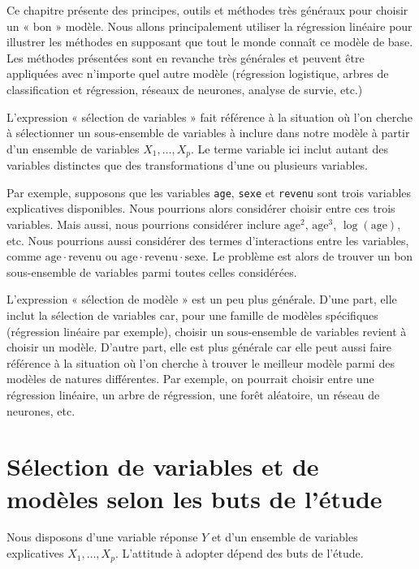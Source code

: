 \documentclass[
  11pt,
  letterpaper,
]{book}
\theoremstyle{definition}
\theoremstyle{definition}
\theoremstyle{definition}
\theoremstyle{definition}
\theoremstyle{remark}
\begin{document}
Ce chapitre présente des principes, outils et méthodes très généraux pour choisir un « bon » modèle. Nous allons principalement utiliser la régression linéaire pour illustrer les méthodes en supposant que tout le monde connaît ce modèle de base. Les méthodes présentées sont en revanche très générales et peuvent être appliquées avec n'importe quel autre modèle (régression logistique, arbres de classification et régression, réseaux de neurones, analyse de survie, etc.)

L'expression « sélection de variables » fait référence à la situation où l'on cherche à sélectionner un sous-ensemble de variables à inclure dans notre modèle à partir d'un ensemble de variables \(X_1, \ldots, X_p\). Le terme variable ici inclut autant des variables distinctes que des transformations d'une ou plusieurs variables.

Par exemple, supposons que les variables \texttt{age}, \texttt{sexe} et \texttt{revenu} sont trois variables explicatives disponibles. Nous pourrions alors considérer choisir entre ces trois variables. Mais aussi, nous pourrions considérer inclure \(\mathrm{age}^2\), \(\mathrm{age}^3\), \(\log(\mathrm{age})\), etc. Nous pourrions aussi considérer des termes d'interactions entre les variables, comme \(\mathrm{age} \cdot \mathrm{revenu}\) ou \(\mathrm{age}\cdot\mathrm{revenu}\cdot\mathrm{sexe}\). Le problème est alors de trouver un bon sous-ensemble de variables parmi toutes celles considérées.

L'expression « sélection de modèle » est un peu plus générale. D'une part, elle inclut la sélection de variables car, pour une famille de modèles spécifiques (régression linéaire par exemple), choisir un sous-ensemble de variables revient à choisir un modèle. D'autre part, elle est plus générale car elle peut aussi faire référence à la situation où l'on cherche à trouver le meilleur modèle parmi des modèles de natures différentes. Par exemple, on pourrait choisir entre une régression linéaire, un arbre de régression, une forêt aléatoire, un réseau de neurones, etc.

\hypertarget{suxe9lection-de-variables-et-de-moduxe8les-selon-les-buts-de-luxe9tude}{%
\section{Sélection de variables et de modèles selon les buts de l'étude}\label{suxe9lection-de-variables-et-de-moduxe8les-selon-les-buts-de-luxe9tude}}

Nous disposons d'une variable réponse \(Y\) et d'un ensemble de variables explicatives \(X_1, \ldots, X_p\). L'attitude à adopter dépend des buts de l'étude.
\end{document}
